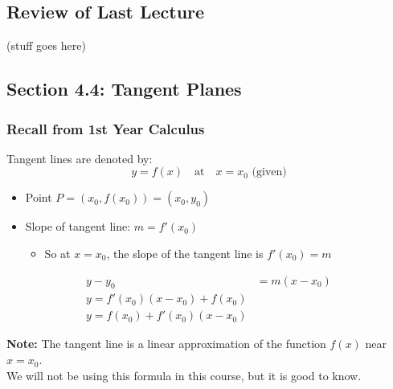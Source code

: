 \documentclass{article}
\begin{document}
\renewcommand{\familydefault}{\rmdefault}



\setcounter{page}{0}
\newpage
\tableofcontents
\newpage






\normalsize

\setcounter{page}{1}

\subsection*{Review of Last Lecture}

(stuff goes here)

\subsection*{Section 4.4: Tangent Planes}

\subsubsection*{Recall from 1st Year Calculus}

\begin{definitionbox}
    Tangent lines are denoted by:
    \[
        y = f(x) \quad \text{at} \quad x = x_0 \text{ (given)}
    \]
    \begin{itemize}
        \item Point $P = (x_0, f(x_0)) = (x_0, y_0)$
        \item Slope of tangent line: $m = f'(x_0)$
        \begin{itemize}
            \item So at $x = x_0$, the slope of the tangent line is $f'(x_0) = m$
        \end{itemize}
    \end{itemize}

    \begin{align*}
        y - y_0 &= m(x - x_0) \\
        y = f'(x_0)(x - x_0) + f(x_0) \\
        y = f(x_0) + f'(x_0)(x - x_0)
    \end{align*}

    \begin{remarkbox}
        \textbf{Note:} The tangent line is a linear approximation of the function $f(x)$ near $x = x_0$. \\
        We will not be using this formula in this course, but it is good to know.
    \end{remarkbox}
\end{definitionbox}
\end{document}
